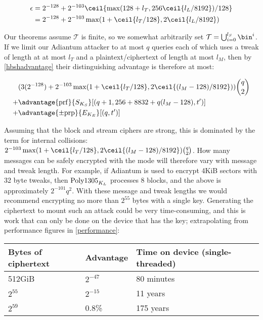 \documentclass[eprint.tex]{subfiles}
\begin{document}
\begin{align*}
\epsilon &= 2^{-128} + 2^{-103}\ceil{\max(128 + l_T, 256\ceil{l_L/8192})/128}  \\
&= 2^{-128} + 2^{-103}\max(1 + \ceil{l_T/128}, 2\ceil{l_L/8192})
\end{align*}\label{adiantumepsilon}

Our theorems assume $\mathcal{T}$ is finite,
so we somewhat arbitrarily set
$\mathcal{T} = \bigcup_{i=0}^{l_S}\bin^i$.
If we limit our Adiantum attacker to at most $q$ queries each of which uses a tweak of length at
at most $l_T$ and a plaintext/ciphertext of length at most $l_M$, then by \autoref{hbshadvantage}
their distinguishing advantage is therefore at most:

\begin{align*}
{}&( 3(2^{-128}) + 2^{-103}\max(1 + \ceil{l_T/128}, 2\ceil{(l_M - 128)/8192}))\binom{q}{2} \\
+{}& \advantage{\mathrm{prf}}{S_{K_S}}[(q + 1, 256 + 8832 + q(l_M - 128), t')] \\
+{}& \advantage{\pm \mathrm{prp}}{E_{K_E}}[(q, t')] \\
\end{align*}

Assuming that the block and stream ciphers are strong, this is dominated by the
term for internal collisions: $2^{-103}\max(1 + \ceil{l_T/128}, 2\ceil{(l_M -
128)/8192})\binom{q}{2}$. How many messages can be safely encrypted with the
mode will therefore vary with message and tweak length. For example, if Adiantum
is used to encrypt 4KiB sectors with 32 byte tweaks, then $\operatorname{Poly1305}_{K_L}$
processes 8 blocks, and the above is approximately $2^{-101}q^2$. With these
message and tweak lengths we would recommend encrypting no more than $2^{55}$
bytes with a single key. Generating the ciphertext to mount such an attack could
be very time-consuming, and this is work that can only be done on the device
that has the key; extrapolating from performance figures in
\autoref{performance}:

\vspace{0.3cm}
\begin{tabular}{llll}
    Bytes of ciphertext & Advantage & Time on device (single-threaded) \\
    \hline
    512GiB & $2^{-47}$ & 80 minutes  \\
    $2^{55}$ & $2^{-15}$ & 11 years \\
    $2^{59}$ & 0.8\% & 175 years &
\end{tabular}
\vspace{0.3cm}

\subbib
\end{document}
